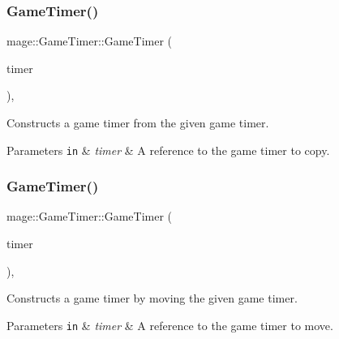 \subsubsection{\texorpdfstring{Game\+Timer()}{GameTimer()}\hspace{0.1cm}{\footnotesize\ttfamily [2/3]}}
{\footnotesize\ttfamily mage\+::\+Game\+Timer\+::\+Game\+Timer (\begin{DoxyParamCaption}\item[{const \mbox{\hyperlink{classmage_1_1_game_timer}{Game\+Timer}} \&}]{timer }\end{DoxyParamCaption})\hspace{0.3cm}{\ttfamily [default]}, {\ttfamily [noexcept]}}

Constructs a game timer from the given game timer.


\begin{DoxyParams}[1]{Parameters}
\mbox{\tt in}  & {\em timer} & A reference to the game timer to copy. \\
\hline
\end{DoxyParams}
\mbox{\label{classmage_1_1_game_timer_a5be12a14c07e264f402635a87b78b401}} 
\subsubsection{\texorpdfstring{Game\+Timer()}{GameTimer()}\hspace{0.1cm}{\footnotesize\ttfamily [3/3]}}
{\footnotesize\ttfamily mage\+::\+Game\+Timer\+::\+Game\+Timer (\begin{DoxyParamCaption}\item[{\mbox{\hyperlink{classmage_1_1_game_timer}{Game\+Timer}} \&\&}]{timer }\end{DoxyParamCaption})\hspace{0.3cm}{\ttfamily [default]}, {\ttfamily [noexcept]}}

Constructs a game timer by moving the given game timer.


\begin{DoxyParams}[1]{Parameters}
\mbox{\tt in}  & {\em timer} & A reference to the game timer to move. \\
\hline
\end{DoxyParams}
\mbox{\label{classmage_1_1_game_timer_a1ba81ccdb247f932e7a396f1ce773bbd}} 
